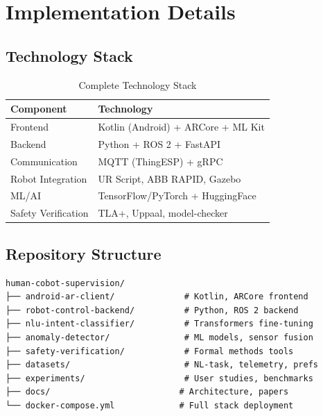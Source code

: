 \documentclass[12pt,a4paper,oneside]{book}
\begin{document}
\newpage

\chapter{Implementation Details}

\section{Technology Stack}

\begin{table}[H]
\centering
\begin{tabular}{|l|l|}
\hline
\textbf{Component} & \textbf{Technology} \\
\hline
Frontend & Kotlin (Android) + ARCore + ML Kit \\
Backend & Python + ROS 2 + FastAPI \\
Communication & MQTT (ThingESP) + gRPC \\
Robot Integration & UR Script, ABB RAPID, Gazebo \\
ML/AI & TensorFlow/PyTorch + HuggingFace \\
Safety Verification & TLA+, Uppaal, model-checker \\
\hline
\end{tabular}
\caption{Complete Technology Stack}
\end{table}

\section{Repository Structure}

\begin{verbatim}
human-cobot-supervision/
├── android-ar-client/              # Kotlin, ARCore frontend
├── robot-control-backend/          # Python, ROS 2 backend
├── nlu-intent-classifier/          # Transformers fine-tuning
├── anomaly-detector/               # ML models, sensor fusion
├── safety-verification/            # Formal methods tools
├── datasets/                       # NL-task, telemetry, prefs
├── experiments/                    # User studies, benchmarks
├── docs/                          # Architecture, papers
└── docker-compose.yml             # Full stack deployment
\end{verbatim}
\end{document}
